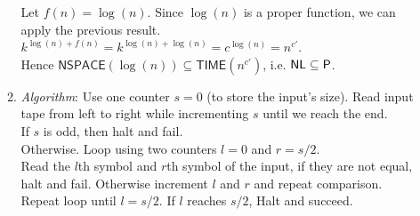 \documentclass[a4paper, draft, 12pt]{article}
\begin{document}
\begin{enumerate}
\begin{enumerate}
  Let $f(n) = \log(n)$. Since $\log(n)$ is a proper function, we can apply the previous result. 
  $k^{\log(n)+f(n)} = k^{\log(n)+\log(n)} = c^{\log(n)} = n^{c'}$. \\
  Hence $\textsf{NSPACE}(\log(n)) \subseteq \textsf{TIME}(n^{c'})$, i.e. $\textsf{NL} \subseteq \textsf{P}$.
  \item %
  \textit{Algorithm}:
  Use one counter $s = 0$ (to store the input's size).
  Read input tape from left to right while incrementing $s$ until we reach the end. \\
  If $s$ is odd, then halt and fail. \\
  Otherwise. Loop using two counters $l = 0$ and $r = s/2$. \\
  Read the $l$th symbol and $r$th symbol of the input, if they are not equal, halt and fail.
  Otherwise increment $l$ and $r$ and repeat comparison. \\
  Repeat loop until $l = s/2$. If $l$ reaches $s/2$, Halt and succeed.


\end{enumerate}
\end{enumerate}
\end{document}
